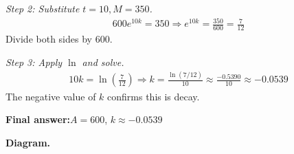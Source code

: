 \documentclass[11pt]{article}
\begin{document}
\textit{Step 2: Substitute \( t = 10, M = 350 \).}
\[\begin{gathered}
600e^{10k} = 350 \Rightarrow e^{10k} = \frac{350}{600} = \frac{7}{12}
\end{gathered}\]
Divide both sides by 600.

\textit{Step 3: Apply \( \ln \) and solve.}
\[\begin{gathered}
10k = \ln\!\left(\frac{7}{12}\right) \Rightarrow k = \frac{\ln(7/12)}{10} \approx \frac{-0.5390}{10} \approx -0.0539
\end{gathered}\]
The negative value of \( k \) confirms this is decay.

\begin{answerbox}
\textbf{Final answer:}\quad \(\displaystyle  A = 600 \), \(\displaystyle  k \approx -0.0539 \)
\end{answerbox}
\textbf{Diagram.}
\end{document}
